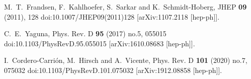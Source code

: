 \begin{thebibliography}{99}
M.~T.~Frandsen, F.~Kahlhoefer, S.~Sarkar and K.~Schmidt-Hoberg,
JHEP \textbf{09} (2011), 128
doi:10.1007/JHEP09(2011)128
[arXiv:1107.2118 [hep-ph]].

C.~E.~Yaguna,
Phys. Rev. D \textbf{95} (2017) no.5, 055015
doi:10.1103/PhysRevD.95.055015
[arXiv:1610.08683 [hep-ph]].

I.~Cordero-Carri\'on, M.~Hirsch and A.~Vicente,
Phys. Rev. D \textbf{101} (2020) no.7, 075032
doi:10.1103/PhysRevD.101.075032
[arXiv:1912.08858 [hep-ph]].

\end{thebibliography}
